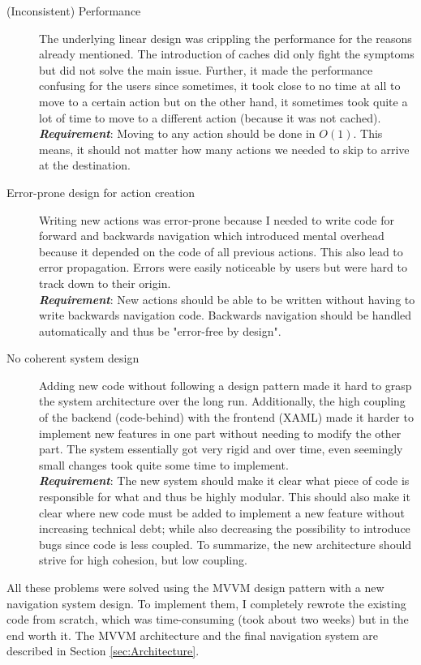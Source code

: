 \begin{description}
\item [(Inconsistent) Performance] The underlying linear design was crippling the performance for the reasons already mentioned. The introduction of caches did only fight the symptoms but did not solve the main issue. Further, it made the performance confusing for the users since sometimes, it took close to no time at all to move to a certain action but on the other hand, it sometimes took quite a lot of time to move to a different action (because it was not cached). \\
\textit{\textbf{Requirement}}: Moving to any action should be done in $O(1)$. This means, it should not matter how many actions we needed to skip to arrive at the destination.
\item [Error-prone design for action creation] Writing new actions was error-prone because I needed to write code for forward and backwards navigation which introduced mental overhead because it depended on the code of all previous actions. This also lead to error propagation. Errors were easily noticeable by users but were hard to track down to their origin.\\
\textit{\textbf{Requirement}}: New actions should be able to be written without having to write backwards navigation code. Backwards navigation should be handled automatically and thus be "error-free by design".
\item [No coherent system design] Adding new code without following a design pattern made it hard to grasp the system architecture over the long run. Additionally, the high coupling of the backend (code-behind) with the frontend (XAML) made it harder to implement new features in one part without needing to modify the other part. The system essentially got very rigid and over time, even seemingly small changes took quite some time to implement.\\
\textit{\textbf{Requirement}}: The new system should make it clear what piece of code is responsible for what and thus be highly modular. This should also make it clear where new code must be added to implement a new feature without increasing technical debt; while also decreasing the possibility to introduce bugs since code is less coupled. To summarize, the new architecture should strive for high cohesion, but low coupling.
\end{description}

All these problems were solved using the MVVM design pattern with a new navigation system design. To implement them, I completely rewrote the existing code from scratch, which was time-consuming (took about two weeks) but in the end worth it. The MVVM architecture and the final navigation system are described in Section \ref{sec:Architecture}.
